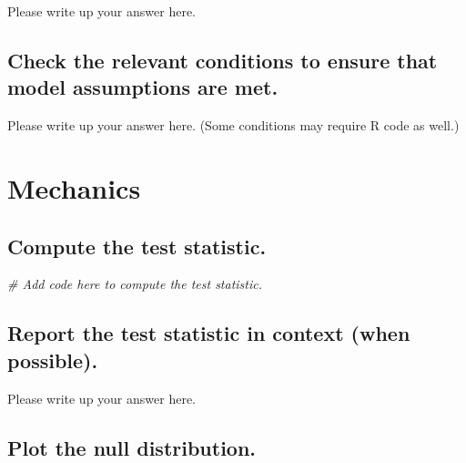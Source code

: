 \documentclass[
]{book}
\newenvironment{Shaded}{\begin{snugshade}}{\end{snugshade}}
\newcommand{\CommentTok}[1]{\textcolor[rgb]{0.56,0.35,0.01}{\textit{#1}}}
\begin{document}
Please write up your answer here.

\hypertarget{check-the-relevant-conditions-to-ensure-that-model-assumptions-are-met.-3}{%
\subsection*{Check the relevant conditions to ensure that model assumptions are met.}\label{check-the-relevant-conditions-to-ensure-that-model-assumptions-are-met.-3}}

Please write up your answer here. (Some conditions may require R code as well.)

\hypertarget{mechanics-2}{%
\section*{Mechanics}\label{mechanics-2}}

\hypertarget{compute-the-test-statistic.-2}{%
\subsection*{Compute the test statistic.}\label{compute-the-test-statistic.-2}}

\begin{Shaded}
\begin{Highlighting}[]
\CommentTok{\# Add code here to compute the test statistic.}
\end{Highlighting}
\end{Shaded}

\hypertarget{report-the-test-statistic-in-context-when-possible.-2}{%
\subsection*{Report the test statistic in context (when possible).}\label{report-the-test-statistic-in-context-when-possible.-2}}

Please write up your answer here.

\hypertarget{plot-the-null-distribution.-2}{%
\subsection*{Plot the null distribution.}\label{plot-the-null-distribution.-2}}
\end{document}
